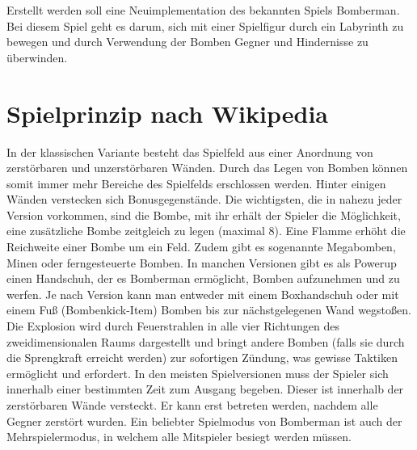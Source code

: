 \documentclass{programmierpraktikum}
\subtitle{Bomberman}
\begin{document}
\maketitle
Erstellt werden soll eine Neuimplementation des bekannten Spiels Bomberman. Bei diesem Spiel
geht es darum, sich mit einer Spielfigur durch ein Labyrinth zu bewegen und durch Verwendung der
Bomben Gegner und Hindernisse zu überwinden.
%
\section{Spielprinzip nach Wikipedia}
In der klassischen Variante besteht das Spielfeld aus einer Anordnung von zerstörbaren und
unzerstörbaren Wänden. Durch das Legen von Bomben können somit immer mehr Bereiche des
Spielfelds erschlossen werden. Hinter einigen Wänden verstecken sich Bonusgegenstände. Die
wichtigsten, die in nahezu jeder Version vorkommen, sind die Bombe, mit ihr erhält der Spieler die
Möglichkeit, eine zusätzliche Bombe zeitgleich zu legen (maximal 8). Eine Flamme erhöht die
Reichweite einer Bombe um ein Feld. Zudem gibt es sogenannte Megabomben, Minen oder
ferngesteuerte Bomben. In manchen Versionen gibt es als Powerup einen Handschuh, der es
Bomberman ermöglicht, Bomben aufzunehmen und zu werfen. Je nach Version kann man entweder
mit einem Boxhandschuh oder mit einem Fuß (Bombenkick-Item) Bomben bis zur nächstgelegenen
Wand wegstoßen.
Die Explosion wird durch Feuerstrahlen in alle vier Richtungen des zweidimensionalen Raums
dargestellt und bringt andere Bomben (falls sie durch die Sprengkraft erreicht werden) zur
sofortigen Zündung, was gewisse Taktiken ermöglicht und erfordert. In den meisten Spielversionen
muss der Spieler sich innerhalb einer bestimmten Zeit zum Ausgang begeben. Dieser ist innerhalb
der zerstörbaren Wände versteckt. Er kann erst betreten werden, nachdem alle Gegner zerstört
wurden.
Ein beliebter Spielmodus von Bomberman ist auch der Mehrspielermodus, in welchem alle
Mitspieler besiegt werden müssen.
%
\end{document}
